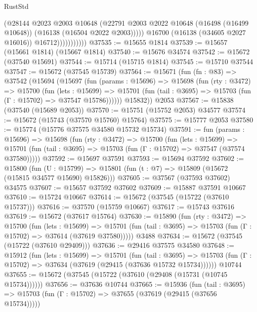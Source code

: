 \begin{lexlean}{RustStd}
\begin{coremodule}
                            (@28144
                              @2023
                              @2003
                              @10648
                              (@22791
                                @2003
                                @2022
                                @10648
                                (@16498 (@16499 @10648))
                                (@16138 (@16504 @2022 @2003)))))
                          @16700
                          (@16138 (@34605 @2027 @16016))
                          @16712)))))))))))
@37535 := @15655 @1814
@37539 := @15657 (@15661 @1814) (@15667 @1814)
@37540 := @15676 @34574
@37542 := @15672 (@37540 @15691)
@37544 := @15714 (@15715 @1814)
@37545 := @15710 @37544
@37547 := @15672 (@37545 @15739)
@37564 := @15671
    (fun (fn : @83) =>
    @37542
      (@15694
        (@15697
          (fun (params : @15696) =>
          @15698
            (fun (rty : @3472) =>
            @15700
              (fun (lets : @15699) =>
              @15701 (fun (tail : @3695) => @15703 (fun (Γ : @15702) => @37547 @15786))))))
        @15832))
    @2053
@37567 := @15838 (@37540 (@15689 @2053))
@37570 := @15751 (@15752 @2053) @34577
@37574 := @15672 (@15743 (@37570 @15760) @15764)
@37575 := @15777 @2053
@37580 := @15774 (@15776 @37575 @34580 @15732 @15734)
@37591 := fun (params : @15696) =>
  @15698
    (fun (rty : @3472) =>
    @15700
      (fun (lets : @15699) =>
      @15701 (fun (tail : @3695) => @15703 (fun (Γ : @15702) => @37547 (@37574 @37580)))))
@37592 := @15697 @37591
@37593 := @15694 @37592
@37602 := @15800
    (fun (U : @15799) => @15801 (fun (t : @7) => @15809 (@15672 (@15815 @34577 @15690) @15826)))
@37605 := @37567 (@37593 @37602) @34575
@37607 := @15657 @37592 @37602
@37609 := @15887 @37591 @10667
@37610 := @15724 @10667
@37614 := @15672 (@37545 (@15722 (@37610 @15737)))
@37616 := @37570 (@15759 @10667)
@37617 := @15743 @37616
@37619 := @15672 (@37617 @15764)
@37630 := @15890
    (fun (rty : @3472) =>
    @15700
      (fun (lets : @15699) =>
      @15701 (fun (tail : @3695) => @15703 (fun (Γ : @15702) => @37614 (@37619 @37580)))))
    @3488
@37634 := @15672 (@37545 (@15722 (@37610 @29409)))
@37636 := @29416 @37575 @34580
@37648 := @15912
    (fun (lets : @15699) =>
    @15701
      (fun (tail : @3695) =>
      @15703 (fun (Γ : @15702) => @37634 (@37619 (@29415 (@37636 @15732 @15734))))))
    @10744
@37655 := @15672 (@37545 (@15722 (@37610 (@29408 (@15731 (@10745 @15734))))))
@37656 := @37636 @10744
@37665 := @15936
    (fun (tail : @3695) => @15703 (fun (Γ : @15702) => @37655 (@37619 (@29415 (@37656 @15734)))))

\end{coremodule}
\end{lexlean}
